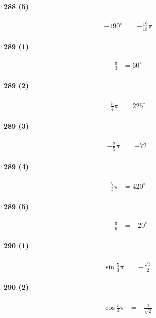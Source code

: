\documentclass[fleqn,a4j,dvipdfmx,uplatex,twocolumn]{jsarticle}
\begin{document}
\paragraph{288 (5)}
\begin{align*}
  -190^{\circ} &= -\frac{19}{18} \pi
\end{align*}

\paragraph{289 (1)}
\begin{align*}
  \frac{\pi}{3} &= 60^{\circ}
\end{align*}

\paragraph{289 (2)}
\begin{align*}
  \frac{5}{4} \pi &= 225^{\circ}
\end{align*}

\paragraph{289 (3)}
\begin{align*}
  -\frac{2}{5} \pi &= -72^{\circ}
\end{align*}

\paragraph{289 (4)}
\begin{align*}
  \frac{7}{3} \pi &= 420^{\circ}
\end{align*}

\paragraph{289 (5)}
\begin{align*}
  -\frac{\pi}{9} &= -20^{\circ}
\end{align*}

\paragraph{290 (1)}
\begin{align*}
  \sin \frac{5}{3} \pi &= -\frac{\sqrt{3}}{2}
\end{align*}

\paragraph{290 (2)}
\begin{align*}
  \cos \frac{5}{4} \pi &= -\frac{1}{\sqrt{2}}
\end{align*}
\end{document}
